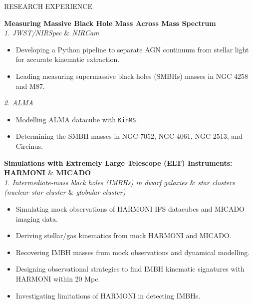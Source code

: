 \documentclass{resume} %
\begin{document}
\begin{rSection}{RESEARCH EXPERIENCE}

\textbf{Measuring Massive Black Hole Mass Across Mass Spectrum} \\ %
\textit{1. JWST/NIRSpec $\&$ NIRCam}
\vspace{-2mm}
\begin{itemize}
    \itemsep -5pt {} 
     \item Developing a Python pipeline to separate AGN continuum from stellar light for accurate kinematic extraction.
     \item Leading measuring supermassive black holes (SMBHs) masses in NGC 4258 and M87.
 \end{itemize}
\textit{2. ALMA}
\vspace{-2mm}
\begin{itemize}
    \itemsep -5pt {} 
     \item Modelling ALMA datacube with {\tt KinMS}.
     \item Determining the SMBH masses in NGC 7052, NGC 4061, NGC 2513, and Circinus.
 \end{itemize}
 
\textbf{Simulations with Extremely Large Telescope (ELT) Instruments: HARMONI $\&$ MICADO}\\
\textit{1. Intermediate‑mass black holes (IMBHs) in dwarf galaxies $\&$ star clusters (nuclear star cluster $\&$ globular cluster)} %
\vspace{-2mm}
\begin{itemize}
    \itemsep -5pt {} 
     \item Simulating mock observations of HARMONI IFS datacubes and MICADO imaging data.
     \item Deriving stellar/gas kinematics from mock HARMONI and MICADO. 
     \item Recovering IMBH masses from mock observations and dynamical modelling.
     \item Designing observational strategies to find IMBH kinematic signatures with HARMONI within 20 Mpc.
     \item Investigating limitations of HARMONI in detecting IMBHs.
 \end{itemize}


\end{rSection}
\end{document}
